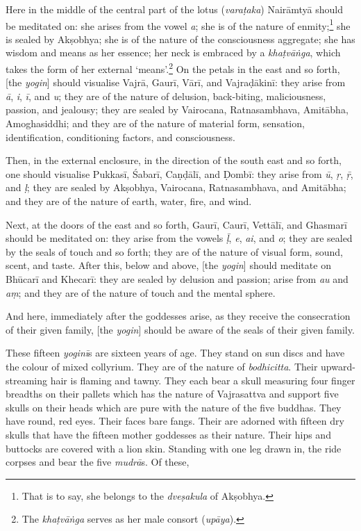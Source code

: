 \documentclass[naipra.tex]{subfiles}
\begin{document}
Here in the middle of the central part of the lotus (\emph{varaṭaka}) Nairāmtyā should be meditated on: she arises from the vowel \emph{a}; she is of the nature of enmity;\footnote{
	That is to say, she belongs to the \emph{dveṣakula} of Akṣobhya.
} she is sealed by Akṣobhya; she is of the nature of the consciousness aggregate; she has wisdom and means as her essence; her neck is embraced by a \emph{khaṭvāṅga}, which takes the form of her external `means'.\footnote{
	The \emph{khaṭvāṅga} serves as her male consort (\emph{upāya}).
} On the petals in the east and so forth, [the \emph{yogin}] should visualise Vajrā, Gaurī, Vārī, and Vajraḍākinī: they arise from \emph{ā}, \emph{i}, \emph{ī}, and \emph{u}; they are of the nature of delusion, back-biting, maliciousness, passion, and jealousy; they are sealed by Vairocana, Ratnasambhava, Amitābha, Amoghasiddhi; and they are of the nature of material form, sensation, identification, conditioning factors, and consciousness.

Then, in the external enclosure, in the direction of the south east and so forth, one should visualise Pukkasī, Śabarī, Caṇḍālī, and Ḍombī: they arise from \emph{ū}, \emph{ṛ}, \emph{ṝ}, and \emph{ḷ}; they are sealed by Akṣobhya, Vairocana, Ratnasambhava, and Amitābha; and they are of the nature of earth, water, fire, and wind.

Next, at the doors of the east and so forth, Gaurī, Caurī, Vettālī, and Ghasmarī should be meditated on: they arise from the vowels \emph{ḹ}, \emph{e}, \emph{ai}, and \emph{o}; they are sealed by the seals of touch and so forth; they are of the nature of visual form, sound, scent, and taste.
After this, below and above, [the \emph{yogin}] should meditate on Bhūcarī and Khecarī: they are sealed by delusion and passion; arise from \emph{au} and \emph{aṃ}; and they are of the nature of touch and the mental sphere.

And here, immediately after the goddesses arise, as they receive the consecration of their given family, [the \emph{yogin}] should be aware of the seals of their given family. 

These fifteen \emph{yoginī}s are sixteen years of age.
They stand on sun discs and have the colour of mixed collyrium.
They are of the nature of \emph{bodhicitta}.
Their upward-streaming hair is flaming and tawny.
They each bear a skull measuring four finger breadths \crux on their pallets \crux which has the nature of Vajrasattva and support five skulls on their heads which are pure with the nature of the five buddhas.
They have round, red eyes.
Their faces bare fangs.
Their are adorned with fifteen dry skulls that have the fifteen mother goddesses as their nature.
Their hips and buttocks are covered with a lion skin.
Standing with one leg drawn in, the ride corpses and bear the five \emph{mudrā}s. 
Of these,
\end{document}
